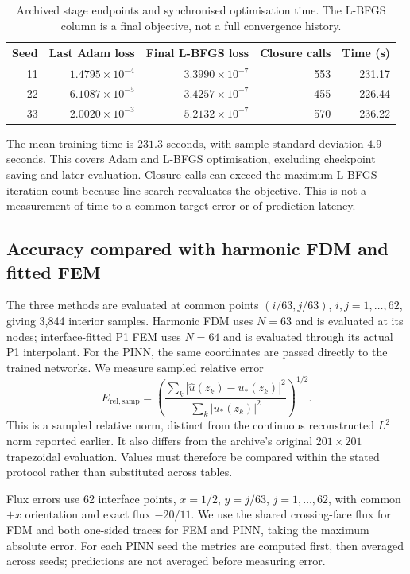 \begin{table}[H]\centering\small
\caption{Archived stage endpoints and synchronised optimisation time.
The L-BFGS column is a final objective, not a full convergence history.}
\label{tab:pinn_endpoints}
\begin{tabular}{@{}rrrrr@{}}\toprule
Seed & Last Adam loss & Final L-BFGS loss & Closure calls & Time (s)\\\midrule
11 & $1.4795\times10^{-4}$ & $3.3990\times10^{-7}$ & 553 & 231.17\\
22 & $6.1087\times10^{-5}$ & $3.4257\times10^{-7}$ & 455 & 226.44\\
33 & $2.0020\times10^{-3}$ & $5.2132\times10^{-7}$ & 570 & 236.22\\\bottomrule
\end{tabular}
\end{table}

The mean training time is $231.3$ seconds, with sample standard deviation
$4.9$ seconds. This covers Adam and L-BFGS optimisation, excluding checkpoint
saving and later evaluation. Closure calls can exceed the maximum L-BFGS
iteration count because line search reevaluates the objective. This is not
a measurement of time to a common target error or of prediction latency.

\subsection{Accuracy compared with harmonic FDM and fitted FEM}
The three methods are evaluated at common points
$(i/63,j/63)$, $i,j=1,\ldots,62$, giving 3,844 interior samples.
Harmonic FDM uses $N=63$ and is evaluated at its nodes; interface-fitted
P1 FEM uses $N=64$ and is evaluated through its actual P1 interpolant.
For the PINN, the same coordinates are passed directly to the trained
networks. We measure sampled relative error
\begin{equation}
 E_{\mathrm{rel,samp}}
 =\left(\frac{\sum_k|\widehat u(z_k)-u_*(z_k)|^2}
 {\sum_k|u_*(z_k)|^2}\right)^{1/2}.
 \label{eq:pinn_sampled_error}
\end{equation}
This is a sampled relative norm, distinct from the continuous reconstructed
$L^2$ norm reported earlier. It also differs from the archive's original
$201\times201$ trapezoidal evaluation. Values must therefore be compared
within the stated protocol rather than substituted across tables.

Flux errors use 62 interface points, $x=1/2$, $y=j/63$,
$j=1,\ldots,62$, with common $+x$ orientation and exact flux $-20/11$.
We use the shared crossing-face flux for FDM and both one-sided traces for
FEM and PINN, taking the maximum absolute error. For each PINN seed the
metrics are computed first, then averaged across seeds; predictions are
not averaged before measuring error.

